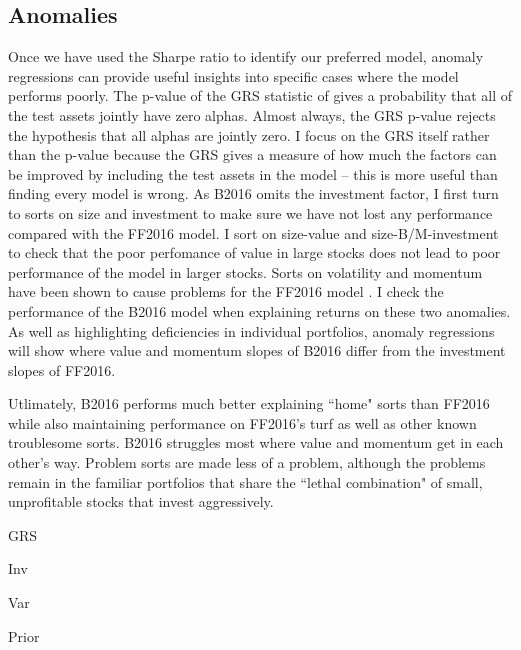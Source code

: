 
\subsection{Anomalies}

Once we have used the Sharpe ratio to identify our preferred model, anomaly regressions
can provide useful insights into specific cases where the model performs poorly. The
p-value of the GRS statistic of \textcite{gibbons1989test} gives a probability that all of
the test assets jointly have zero alphas. Almost always, the GRS p-value rejects the
hypothesis that all alphas are jointly zero. I focus on the GRS itself rather than the
p-value because the GRS gives a measure of how much the factors can be improved by
including the test assets in the model -- this is more useful than finding every model is
wrong. As B2016 omits the investment factor, I first turn to sorts on size and investment
to make sure we have not lost any performance compared with the FF2016 model. I sort on
size-value and size-B/M-investment to check that the poor perfomance of value in large
stocks \parencite{asness2015fact} does not lead to poor performance of the model in larger
stocks. Sorts on volatility \parencite{ang2006cross} and momentum
\parencite{jegadeesh1993returns} have been shown to cause problems for the FF2016 model
\parencite{fama2016dissecting}. I check the performance of the B2016 model when explaining
returns on these two anomalies. As well as highlighting deficiencies in individual
portfolios, anomaly regressions will show where value and momentum slopes of B2016 differ
from the investment slopes of FF2016.


Utlimately, B2016 performs much better explaining ``home" sorts than FF2016 while also
maintaining performance on FF2016's turf as well as other known troublesome sorts. B2016
struggles most where value and momentum get in each other's way. Problem sorts are made
less of a problem, although the problems remain in the familiar portfolios that share the
``lethal combination" of small, unprofitable stocks that invest aggressively.

{GRS}

{Inv}


{Var}

{Prior}
